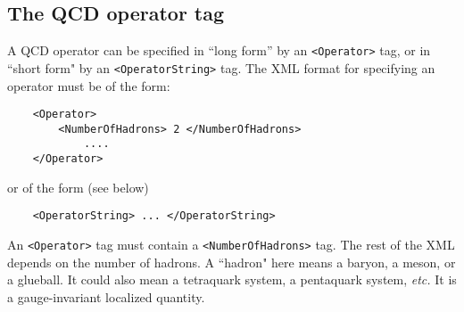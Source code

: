 \documentclass[12pt,notitlepage,letterpaper]{article}
\newcommand{\vb}{\texttt}
\begin{document}
\subsection{The QCD operator tag} \label{sec:qcd_op_tag}
A QCD operator can be specified in ``long form'' by an \vb{<Operator>} tag,
or in ``short form" by an \vb{<OperatorString>} tag.
The XML format for specifying an operator must be of the form:   
\begin{verbatim}                                           
    <Operator>                                                
        <NumberOfHadrons> 2 </NumberOfHadrons>                 
            ....                                              
    </Operator>                                               
\end{verbatim}                                                              
or of the form (see below)                                    
\begin{verbatim}                                                                                                      
    <OperatorString> ... </OperatorString>                    
\end{verbatim}                                                              
An \vb{<Operator>} tag must contain a \vb{<NumberOfHadrons>} tag.      
The rest of the XML depends on the number of hadrons.         
A ``hadron" here means a baryon, a meson, or a glueball.       
It could also mean a tetraquark system, a pentaquark system,  
\textit{etc.}  It is a gauge-invariant localized quantity.            
\end{document}
